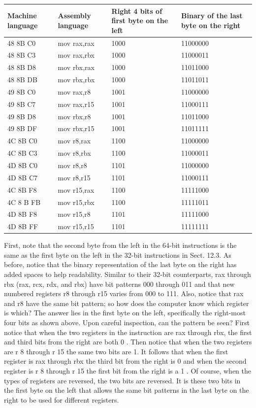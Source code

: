 \documentclass[10pt]{article}
\begin{document}
\begin{center}
\begin{tabular}{|l|l|l|l|}
\hline
Machine language & Assembly language & Right 4 bits of first byte on the left & Binary of the last byte on the right \\
\hline
48 8B C0 & mov rax,rax & 1000 & 11000000 \\
\hline
48 8B C3 & mov rax,rbx & 1000 & 11000011 \\
\hline
48 8B D8 & mov rbx,rax & 1000 & 11011000 \\
\hline
48 8B DB & mov rbx,rbx & 1000 & 11011011 \\
\hline
49 8B C0 & mov rax,r8 & 1001 & 11000000 \\
\hline
49 8B C7 & mov rax,r15 & 1001 & 11000111 \\
\hline
49 8B D8 & mov rbx,r8 & 1001 & 11011000 \\
\hline
49 8B DF & mov rbx,r15 & 1001 & 11011111 \\
\hline
4C 8B C0 & mov r8,rax & 1100 & 11000000 \\
\hline
4C 8B C3 & mov r8,rbx & 1100 & 11000011 \\
\hline
4D 8B C0 & mov r8,r8 & 1101 & 11000000 \\
\hline
4D 8B C7 & mov r8,r15 & 1101 & 11000111 \\
\hline
4C 8B F8 & mov r15,rax & 1100 & 11111000 \\
\hline
4C 8 B FB & mov r15,rbx & 1100 & 11111011 \\
\hline
4D 8B F8 & mov r15,r8 & 1101 & 11111000 \\
\hline
4D 8B FF & mov r15,r15 & 1101 & 11111111 \\
\hline
\end{tabular}
\end{center}

First, note that the second byte from the left in the 64-bit instructions is the same as the first byte on the left in the 32-bit instructions in Sect. 12.3. As before, notice that the binary representation of the last byte on the right has added spaces to help readability. Similar to their 32-bit counterparts, rax through rbx (rax, rcx, rdx, and rbx) have bit patterns 000 through 011 and that new numbered registers r8 through r15 varies from 000 to 111. Also, notice that rax and r8 have the same bit pattern; so how does the computer know which register is which? The answer lies in the first byte on the left, specifically the right-most four bits as shown above. Upon careful inspection, can the pattern be seen? First notice that when the two registers in the instruction are rax through rbx, the first and third bits from the right are both 0 . Then notice that when the two registers are r 8 through r 15 the same two bits are 1. It follows that when the first register is rax through rbx the third bit from the right is 0 and when the second register is r 8 through r 15 the first bit from the right is a 1 . Of course, when the types of registers are reversed, the two bits are reversed. It is these two bits in the first byte on the left that allows the same bit patterns in the last byte on the right to be used for different registers.
\end{document}
